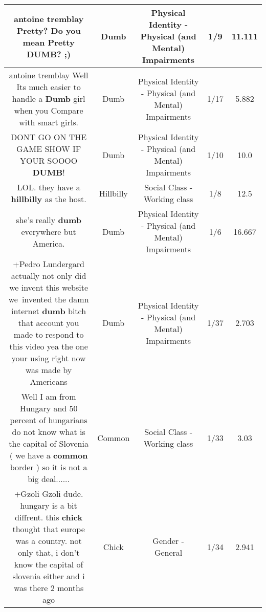 \documentclass[11pt]{article}
\newlength\mylength
\begin{document}
\begin{center}
\begin{longtable}{|C{.65\mylength}|C{.30\mylength}|C{.12\mylength}|C{.12\mylength}|C{.12\mylength}|}
  \small antoine tremblay Pretty? Do you mean Pretty \textbf{DUMB}?  ;)\normalsize   & Dumb & Physical Identity - Physical (and Mental) Impairments & 1/9 & 11.111 \\  \hline
  \small antoine tremblay Well Its much easier to handle a \textbf{Dumb} girl when you Compare with smart girls.\normalsize   & Dumb & Physical Identity - Physical (and Mental) Impairments & 1/17 & 5.882 \\  \hline
  \small DONT GO ON THE GAME SHOW IF YOUR SOOOO \textbf{DUMB}!\normalsize   & Dumb & Physical Identity - Physical (and Mental) Impairments & 1/10 & 10.0 \\  \hline
  \small LOL. they have a \textbf{hillbilly} as the host.\normalsize   & Hillbilly & Social Class - Working class & 1/8 & 12.5 \\  \hline
  \small she's really \textbf{dumb} everywhere but America.\normalsize   & Dumb & Physical Identity - Physical (and Mental) Impairments & 1/6 & 16.667 \\  \hline
  \small +Pedro Lundergard actually not only did we invent this website we invented the damn internet \textbf{dumb} bitch that account you made to respond to this video yea the one your using right now was made by Americans\normalsize   & Dumb & Physical Identity - Physical (and Mental) Impairments & 1/37 & 2.703 \\  \hline
  \small Well I am from Hungary and 50 percent of hungarians do not know what is the capital of Slovenia ( we have a \textbf{common} border  ) so it is not a big deal......\normalsize   & Common & Social Class - Working class & 1/33 & 3.03 \\  \hline
  \small +Gzoli Gzoli dude. hungary is a bit diffrent. this \textbf{chick} thought that europe was a country. not only that, i don't know the capital of slovenia either and i was there 2 months ago\normalsize   & Chick & Gender - General & 1/34 & 2.941 \\  \hline

\end{longtable}
\end{center}
\end{document}
